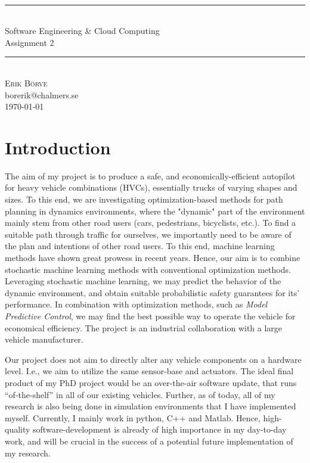 \documentclass[a4paper,11pt]{article}
\newcommand{\HRule}{\rule{\linewidth}{0.5mm}}
\begin{document}
 
 
\begin{center}
\hfill\\[1.5cm]
\HRule \\[0.5cm] %
{ \huge Software Engineering \& Cloud Computing }\\[0.2cm]
{\large Assignment 2}\\ %
\HRule \\[0.5cm] %
\textsc{\large Erik Börve}\\ %
borerik@chalmers.se\\[0.5 cm]   %
\textsc{\large \textsc{\today}}\\    %

\end{center}
\section{Introduction}
The aim of my project is to produce a safe, and economically-efficient autopilot for heavy vehicle combinations (HVCs), essentially trucks of varying shapes and sizes. To this end, we are investigating optimization-based methods for path planning in dynamics environments, where the "dynamic" part of the environment mainly stem from other road users (cars, pedestrians, bicyclists, etc.). To find a suitable path through traffic for ourselves, we importantly need to be aware of the plan and intentions of other road users. To this end, machine learning methods have shown great prowess in recent years. Hence, our aim is to combine stochastic machine learning methods with conventional optimization methods. Leveraging stochastic machine learning, we may predict the behavior of the dynamic environment, and obtain suitable probabilistic safety guarantees for its' performance. In combination with optimization methods, such as \textit{Model Predictive Control}, we may find the best possible way to operate the vehicle for economical efficiency. The project is an industrial collaboration with a large vehicle manufacturer.

Our project does not aim to directly alter any vehicle components on a hardware level. I.e., we aim to utilize the same sensor-base and actuators. The ideal final product of my PhD project would be an over-the-air software update, that runs ``of-the-shelf'' in all of our existing vehicles. Further, as of today, all of my research is also being done in simulation environments that I have implemented myself. Currently, I mainly work in python, C++ and Matlab.  Hence, high-quality software-development is already of high importance in my day-to-day work, and will be crucial in the success of a potential future implementation of my research.
\end{document}
